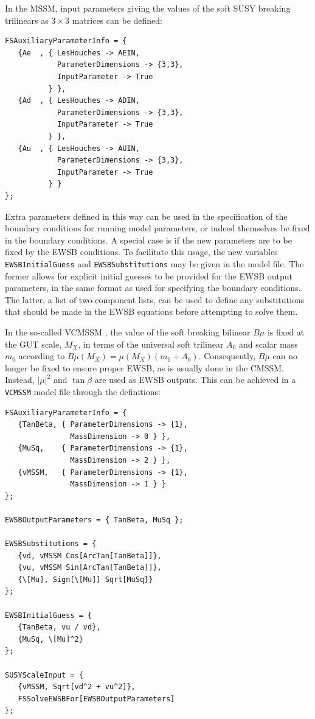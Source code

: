 \documentclass[final,3p,11pt,pdflatex]{elsarticle}
\makeatletter
\newcommand{\modelname}[1]{\texttt{#1}\@\xspace}
\newcommand{\code}[1]{\lstinline|#1|}  %
\newcommand{\azero}{\ensuremath{A_0}\xspace}
\newcommand{\mzero}{\ensuremath{m_0}\xspace}
\makeatother
\begin{document}
\begin{example}
In the MSSM, input parameters giving the values of the
soft SUSY breaking trilinears as $3 \times 3$ matrices can be defined:
%
\begin{lstlisting}
FSAuxiliaryParameterInfo = {
   {Ae  , { LesHouches -> AEIN,
            ParameterDimensions -> {3,3},
            InputParameter -> True
          } },
   {Ad  , { LesHouches -> ADIN,
            ParameterDimensions -> {3,3},
            InputParameter -> True
          } },
   {Au  , { LesHouches -> AUIN,
            ParameterDimensions -> {3,3},
            InputParameter -> True
          } }
};
\end{lstlisting}
\end{example}

Extra parameters defined in this way can be used in the specification of the
boundary conditions for running model parameters, or indeed themselves be
fixed in the boundary conditions.  A special case is if the new parameters
are to be fixed by the EWSB conditions.  To facilitate this usage, the new
variables \code{EWSBInitialGuess} and \code{EWSBSubstitutions} may be
given in the model file.  The former allows for explicit initial
guesses to be provided for the EWSB output parameters, in the same format
as used for specifying the boundary conditions.  The latter, a list of
two-component lists, can be used to define any substitutions that should
be made in the EWSB equations before attempting to solve them.

\begin{example}
In the so-called VCMSSM \cite{Ellis:2003pz,Ellis:2004qe}, the value of the soft
breaking bilinear $B\mu$ is fixed at the GUT scale, $M_X$, in terms of the
universal soft trilinear $\azero$ and scalar mass $\mzero$ according to
$B\mu(M_X) = \mu(M_X) (\mzero + \azero)$.  Consequently, $B\mu$ can no longer
be fixed to ensure proper EWSB, as is usually done in the CMSSM\@.  Instead,
$|\mu|^2$ and $\tan\beta$ are used as EWSB outputs.  This can be achieved in a
\modelname{VCMSSM} model file through the definitions:
%
\begin{lstlisting}
FSAuxiliaryParameterInfo = {
   {TanBeta, { ParameterDimensions -> {1},
               MassDimension -> 0 } },
   {MuSq,    { ParameterDimensions -> {1},
               MassDimension -> 2 } },
   {vMSSM,   { ParameterDimensions -> {1},
               MassDimension -> 1 } }
};

EWSBOutputParameters = { TanBeta, MuSq };

EWSBSubstitutions = {
   {vd, vMSSM Cos[ArcTan[TanBeta]]},
   {vu, vMSSM Sin[ArcTan[TanBeta]]},
   {\[Mu], Sign[\[Mu]] Sqrt[MuSq]}
};

EWSBInitialGuess = {
   {TanBeta, vu / vd},
   {MuSq, \[Mu]^2}
};

SUSYScaleInput = {
   {vMSSM, Sqrt[vd^2 + vu^2]},
   FSSolveEWSBFor[EWSBOutputParameters]
};
\end{lstlisting}
\end{example}
\end{document}
